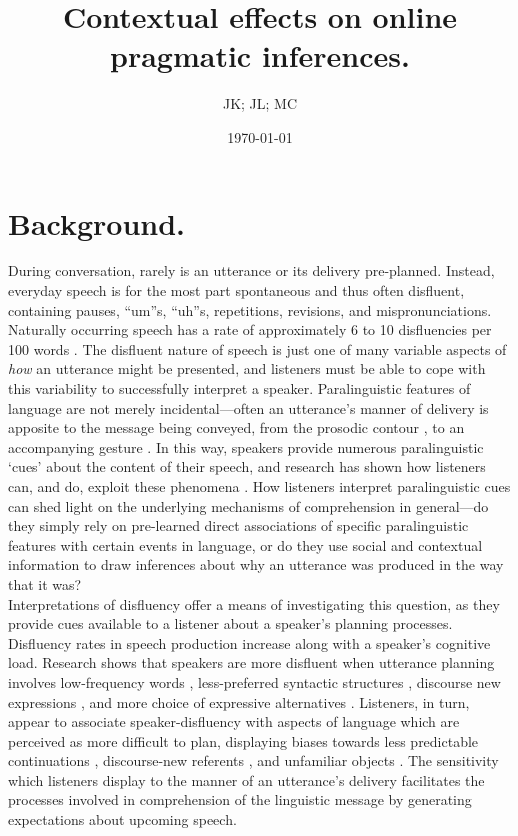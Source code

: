 \documentclass[man]{apa6}
\begin{document}
\title{Contextual effects on online pragmatic inferences.}
\author{JK; JL; MC}
\date{\today}
\maketitle

\section{Background.}
During conversation, rarely is an utterance or its delivery pre-planned.
Instead, everyday speech is for the most part spontaneous and thus often disfluent, containing pauses, ``um''s, ``uh''s, repetitions, revisions, and mispronunciations. 
Naturally occurring speech has a rate of approximately 6 to 10 disfluencies per 100 words \citep{Bortfeld2001, FoxTree1995}.
The disfluent nature of speech is just one of many variable aspects of \textit{how} an utterance might be presented, and listeners must be able to cope with this variability to successfully interpret a speaker.
Paralinguistic features of language are not merely incidental---often an utterance's manner of delivery is apposite to the message being conveyed, from the prosodic contour \citep{Fernald1991}, to an accompanying gesture \citep{Alibali2001}. 
In this way, speakers provide numerous paralinguistic `cues' about the content of their speech, and research has shown how listeners can, and do, exploit these phenomena \citep{Corley2007, Barr2001, Hostetter2011, Frazier2006}.
How listeners interpret paralinguistic cues can shed light on the underlying mechanisms of comprehension in general---do they simply rely on pre-learned direct associations of specific paralinguistic features with certain events in language, or do they use social and contextual information to draw inferences about why an utterance was produced in the way that it was? \\

Interpretations of disfluency offer a means of investigating this question, as they provide cues available to a listener about a speaker's planning processes.
Disfluency rates in speech production increase along with a speaker's cognitive load\citep{Bortfeld2001, Goldman-Eisler1968}.
Research shows that speakers are more disfluent when utterance planning involves low-frequency words \citep{Beattie1979}, less-preferred syntactic structures \citep{Cook2009}, discourse new expressions \citep{Arnold2003}, and more choice of expressive alternatives \citep{Schachter1991}. 
Listeners, in turn, appear to associate speaker-disfluency with aspects of language which are perceived as more difficult to plan, displaying biases towards less predictable continuations \citep{Corley2007}, discourse-new referents \citep{Barr2001, Arnold2004}, and unfamiliar objects \citep{Arnold2007}.
The sensitivity which listeners display to the manner of an utterance's delivery facilitates the processes involved in comprehension of the linguistic message by generating expectations about upcoming speech.\\
\end{document}
